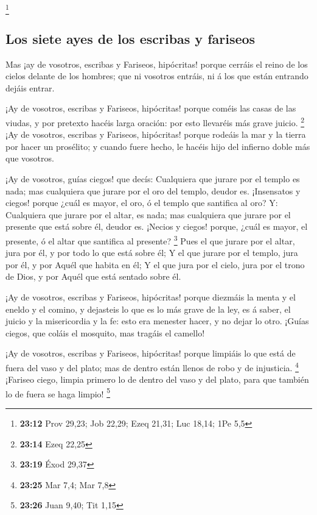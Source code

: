 \footnote{\textbf{23:12} Prov 29,23; Job 22,29; Ezeq 21,31; Luc 18,14;
  1Pe 5,5}

\hypertarget{los-siete-ayes-de-los-escribas-y-fariseos}{%
\subsection{Los siete ayes de los escribas y
fariseos}\label{los-siete-ayes-de-los-escribas-y-fariseos}}

 Mas ¡ay de vosotros, escribas y Fariseos, hipócritas!
porque cerráis el reino de los cielos delante de los hombres; que ni
vosotros entráis, ni á los que están entrando dejáis entrar.

 ¡Ay de vosotros, escribas y Fariseos, hipócritas! porque
coméis las casas de las viudas, y por pretexto hacéis larga oración: por
esto llevaréis más grave juicio. \footnote{\textbf{23:14} Ezeq 22,25}
 ¡Ay de vosotros, escribas y Fariseos, hipócritas! porque
rodeáis la mar y la tierra por hacer un prosélito; y cuando fuere hecho,
le hacéis hijo del infierno doble más que vosotros.

 ¡Ay de vosotros, guías ciegos! que decís: Cualquiera que
jurare por el templo es nada; mas cualquiera que jurare por el oro del
templo, deudor es.  ¡Insensatos y ciegos! porque ¿cuál es
mayor, el oro, ó el templo que santifica al oro?  Y:
Cualquiera que jurare por el altar, es nada; mas cualquiera que jurare
por el presente que está sobre él, deudor es.  ¡Necios y
ciegos! porque, ¿cuál es mayor, el presente, ó el altar que santifica al
presente? \footnote{\textbf{23:19} Éxod 29,37}  Pues el que
jurare por el altar, jura por él, y por todo lo que está sobre él;
 Y el que jurare por el templo, jura por él, y por Aquél
que habita en él;  Y el que jura por el cielo, jura por el
trono de Dios, y por Aquél que está sentado sobre él.

 ¡Ay de vosotros, escribas y Fariseos, hipócritas! porque
diezmáis la menta y el eneldo y el comino, y dejasteis lo que es lo más
grave de la ley, es á saber, el juicio y la misericordia y la fe: esto
era menester hacer, y no dejar lo otro.  ¡Guías ciegos, que
coláis el mosquito, mas tragáis el camello!

 ¡Ay de vosotros, escribas y Fariseos, hipócritas! porque
limpiáis lo que está de fuera del vaso y del plato; mas de dentro están
llenos de robo y de injusticia. \footnote{\textbf{23:25} Mar 7,4; Mar
  7,8}  ¡Fariseo ciego, limpia primero lo de dentro del
vaso y del plato, para que también lo de fuera se haga limpio!
\footnote{\textbf{23:26} Juan 9,40; Tit 1,15}

